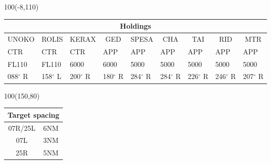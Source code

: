 \documentclass[10pt,landscape,a4paper]{article}
\begin{document}
\begin{textblock}{100}(-8,110)
\begin{table}[]
\begin{tabular}{|l|l|l|l|l|l|l|l|l|}

\multicolumn{9}{c}{\textbf{Holdings}}  \\ \hline
\multicolumn{1}{|c|}{UNOKO}  & \multicolumn{1}{c|}{ROLIS}  & \multicolumn{1}{c|}{KERAX}  & \multicolumn{1}{c|}{GED}    & \multicolumn{1}{c|}{SPESA}  & \multicolumn{1}{c|}{CHA}    & \multicolumn{1}{c|}{TAI}    & \multicolumn{1}{c|}{RID}    & \multicolumn{1}{c|}{MTR} \\ \hline
CTR    & CTR    & CTR    & APP    & APP    & APP    & APP    & APP    & APP    \\
FL110  & FL110  & 6000   & 6000   & 5000   & 5000   & 5000   & 5000   & 5000   \\
088$^\circ$ R & 158$^\circ$ L & 200$^\circ$ R & 180$^\circ$ R & 284$^\circ$ R & 284$^\circ$ R & 226$^\circ$ R & 246$^\circ$ R & 207$^\circ$ R \\ \hline
\end{tabular}
\end{table}
\end{textblock}

\begin{textblock}{100}(150,80)
\begin{table}[]
\begin{tabular}{|c|l|}
\multicolumn{2}{c}{\textbf{Target spacing}} \\ \hline
07R/25L  & 6NM  \\ \hline
07L      & 3NM  \\ \hline
25R      & 5NM  \\ \hline
\end{tabular}
\end{table}
\end{textblock}
\end{document}
